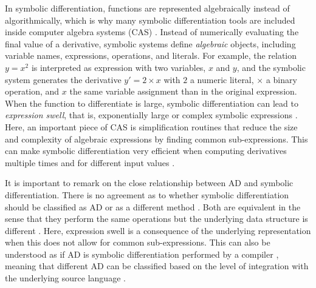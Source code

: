 In symbolic differentiation, functions are represented algebraically instead of algorithmically, which is why many symbolic differentiation tools are included inside computer algebra systems (CAS) \cite{Symbolics_jl_2022}. 
Instead of numerically evaluating the final value of a derivative, symbolic systems define \textit{algebraic} objects, including variable names, expressions, operations, and literals. 
For example, the relation $y = x^2$ is interpreted as expression with two variables, $x$ and $y$, and the symbolic system generates the derivative $y' = 2 \times x$ with $2$ a numeric literal, $\times$ a binary operation, and $x$ the same variable assignment than in the original expression.
When the function to differentiate is large, symbolic differentiation can lead to \textit{expression swell}, that is, exponentially large or complex symbolic expressions \cite{Baydin_Pearlmutter_Radul_Siskind_2015}.
Here, an important piece of CAS is simplification routines that reduce the size and complexity of algebraic expressions by finding common sub-expressions.  
This can make symbolic differentiation very efficient when computing derivatives multiple times and for different input values \cite{Dürrbaum_Klier_Hahn_2002}. 

It is important to remark on the close relationship between AD and symbolic differentiation.
There is no agreement as to whether symbolic differentiation should be classified as AD \cite{juedes1991taxonomy, Elliott_2018, Laue2020} or as a different method \cite{Baydin_Pearlmutter_Radul_Siskind_2015}.  
Both are equivalent in the sense that they perform the same operations but the underlying data structure is different \cite{Laue2020}. 
Here, expression swell is a consequence of the underlying representation when this does not allow for common sub-expressions. 
This can also be understood as if AD is symbolic differentiation performed by a compiler \cite{Elliott_2018}, meaning that different AD can be classified based on the level of integration with the underlying source language \cite{juedes1991taxonomy}.



